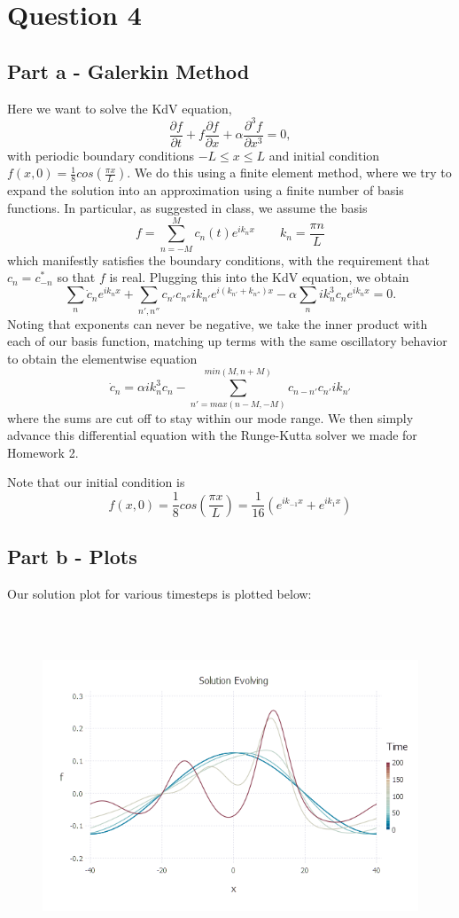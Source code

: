 \documentclass{article}
\begin{document}
\section{Question 4}
\subsection{Part a - Galerkin Method}
Here we want to solve the KdV equation,
$$\frac{\partial f}{\partial t} + f\frac{\partial f}{\partial x} + \alpha \frac{\partial^3 f}{\partial x^3} = 0,$$
with periodic boundary conditions $-L \leq x \leq L$ and initial condition $f(x,0) = \frac{1}{8}cos(\frac{\pi x}{L})$. We do this using a finite element method, where we try to expand the solution into an approximation using a finite number of basis functions. In particular, as suggested in class, we assume the basis
$$f = \sum^{M}_{n=-M}c_n(t)e^{ik_nx} \qquad k_n=\frac{\pi n}{L}$$
which manifestly satisfies the boundary conditions, with the requirement that $c_n = c_{-n}^*$ so that $f$ is real. Plugging this into the KdV equation, we obtain
$$\sum_n\dot{c}_ne^{ik_nx} + \sum_{n',n''}c_{n'}c_{n''}ik_{n'}e^{i(k_{n'}+k_{n''})x} - \alpha\sum_{n}ik_n^3c_ne^{ik_nx} = 0.$$
Noting that exponents can never be negative, we take the inner product with each of our basis function, matching up terms with the same oscillatory behavior to obtain the elementwise equation 
$$\dot{c}_n = \alpha ik_n^3c_n - \sum_{n'=max(n-M,-M)}^{min(M, n+M)}c_{n-n'}c_{n'}ik_{n'}$$
where the sums are cut off to stay within our mode range. We then simply advance this differential equation with the Runge-Kutta solver we made for Homework 2.

Note that our initial condition is
$$f(x,0) = \frac{1}{8}cos(\frac{\pi x}{L}) = \frac{1}{16}(e^{ik_{-1}x} + e^{ik_1x})$$

\subsection{Part b - Plots}
Our solution plot for various timesteps is plotted below:
\begin{figure}[H]
	\includegraphics[width=6in,height=4in]{"q4_solution"}
\end{figure}
\end{document}
